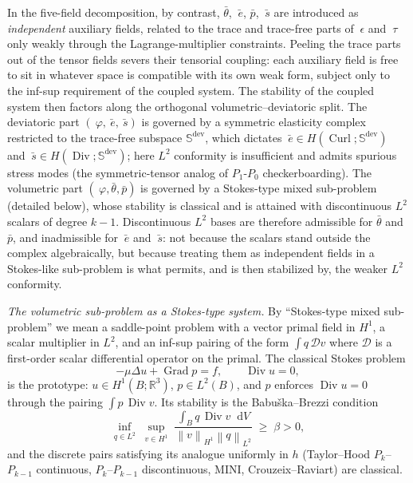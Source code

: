 \documentclass[12pt]{article}
\newcommand{\eps}{~\epsilon}
\newcommand{\ebar}{\bar{~e}}
\newcommand{\btau}{~\tau}
\newcommand{\sbar}{\bar{~s}}
\newcommand{\thbar}{\bar{\theta}}
\newcommand{\pbar}{\bar{p}}
\newcommand{\supdev}{^{\mathrm{dev}}}
\newcommand{\Symsd}{\mathbb{S}\supdev}
\newcommand{\norm}[1]{\left\lVert {#1} \right\rVert}
\DeclareMathOperator{\Div}{Div}
\DeclareMathOperator{\Grad}{Grad}
\DeclareMathOperator{\Curl}{Curl}
\newcommand*\diff{\mathop{}\!\mathrm{d}}
\begin{document}
In the five-field decomposition, by contrast, $\thbar$, $\ebar$,
$\pbar$, $\sbar$ are introduced as \emph{independent} auxiliary
fields, related to the trace and trace-free parts of $\eps$ and
$\btau$ only weakly through the Lagrange-multiplier constraints.
Peeling the trace parts out of the tensor fields severs their
tensorial coupling: each auxiliary field is free to sit in
whatever space is compatible with its own weak form, subject only
to the inf-sup requirement of the coupled system. The stability of the coupled system then factors along the
orthogonal volumetric--deviatoric split. The deviatoric part
$(~\varphi, \ebar, \sbar)$ is governed by a symmetric elasticity
complex restricted to the trace-free subspace $\Symsd$, which
dictates $\ebar \in H(\Curl; \Symsd)$ and $\sbar \in H(\Div;
\Symsd)$; here $L^2$ conformity is insufficient and admits
spurious stress modes (the symmetric-tensor analog of
$P_1$-$P_0$ checkerboarding). The volumetric part $(~\varphi,
\thbar, \pbar)$ is governed by a Stokes-type mixed sub-problem
(detailed below), whose stability is classical and is attained
with discontinuous $L^2$ scalars of degree $k-1$. Discontinuous
$L^2$ bases are therefore admissible for $\thbar$ and $\pbar$, and
inadmissible for $\ebar$ and $\sbar$: not because the scalars stand
outside the complex algebraically, but because treating them as
independent fields in a Stokes-like sub-problem is what permits,
and is then stabilized by, the weaker $L^2$ conformity.

\textit{The volumetric sub-problem as a Stokes-type system.} By
``Stokes-type mixed sub-problem'' we mean a saddle-point problem
with a vector primal field in $H^1$, a scalar multiplier in $L^2$,
and an inf-sup pairing of the form $\int q \,\mathcal{D} v$ where
$\mathcal{D}$ is a first-order scalar differential operator on the
primal. The classical Stokes problem
\begin{equation}
  \label{eq:stokes-classical}
  -\mu \Delta u + \Grad p = f,
  \qquad
  \Div u = 0,
\end{equation}
is the prototype: $u \in H^1(B; \mathbb{R}^3)$, $p \in L^2(B)$, and
$p$ enforces $\Div u = 0$ through the pairing $\int p \, \Div v$.
Its stability is the Babu\v{s}ka--Brezzi condition
\begin{equation}
  \label{eq:babuska-brezzi}
  \inf_{q \in L^2}\;\sup_{v \in H^1}\;
  \frac{\int_B q \, \Div v \diff V}
       {\norm{v}_{H^1} \norm{q}_{L^2}}
  \;\geq\; \beta > 0,
\end{equation}
and the discrete pairs satisfying its analogue uniformly in $h$
(Taylor--Hood $P_k$--$P_{k-1}$ continuous, $P_k$--$P_{k-1}$
discontinuous, MINI, Crouzeix--Raviart) are classical.
\end{document}
